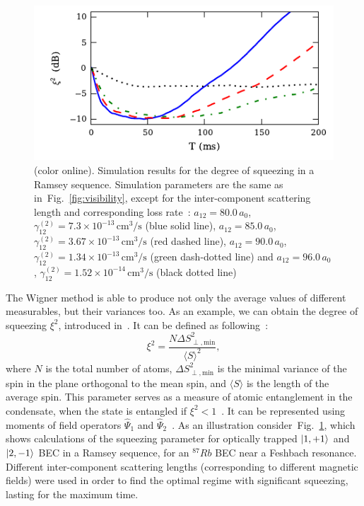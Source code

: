 \documentclass[aps,prl,twocolumn,showpacs,amsmath,amssymb,superscriptaddress]{revtex4-1}
\newcommand{\figref}[1]{Fig.~\ref{#1}}
\newcommand{\ket}[1]{\mbox{\ensuremath{| #1 \rangle}}}
\begin{document}
\begin{figure}
	\includegraphics{figures_generated/ramsey_squeezing.pdf}

	\caption{(color online).
	Simulation results for the degree of squeezing in a Ramsey sequence.
	Simulation parameters are the same as in~\figref{fig:visibility},
	except for the inter-component scattering length and corresponding loss rate~\cite{Kaufman2009}:
	$a_{12} = 80.0\,a_0$, $\gamma^{(2)}_{12} = 7.3 \times 10^{-13}\,\mathrm{cm^3/s}$ (blue solid line),
	$a_{12} = 85.0\,a_0$, $\gamma^{(2)}_{12} = 3.67 \times 10^{-13}\,\mathrm{cm^3/s}$ (red dashed line),
	$a_{12} = 90.0\,a_0$, $\gamma^{(2)}_{12} = 1.34 \times 10^{-13}\,\mathrm{cm^3/s}$ (green dash-dotted line) and
	$a_{12} = 96.0\,a_0$, $\gamma^{(2)}_{12} = 1.52 \times 10^{-14}\,\mathrm{cm^3/s}$ (black dotted line)}

	\label{fig:squeezing}
\end{figure}

The Wigner method is able to produce not only the average values of different measurables,
but their variances too.
As an example, we can obtain the degree of squeezing $\xi^2$, introduced in~\cite{Wineland1994,Sorensen2001}.
It can be defined as following~\cite{Li2009}:
\begin{equation}
\label{eqn:squeezing}
	\xi^2 = \frac{N \Delta S^2_{\perp, \mathrm{min}}}{\langle S \rangle^2},
\end{equation}
where $N$ is the total number of atoms,
$\Delta S^2_{\perp, \mathrm{min}}$ is the minimal variance of the spin in the plane orthogonal to the mean spin,
and $\langle S \rangle$ is the length of the average spin.
This parameter serves as a measure of atomic entanglement in the condensate,
when the state is entangled if $\xi^2 < 1$~\cite{Sorensen2001}.
It can be represented using moments of field operators $\widehat{\Psi}_1$
and $\widehat{\Psi}_2$~\cite{Li2009}.
As an illustration consider~\figref{fig:squeezing}, which shows calculations of the squeezing parameter
for optically trapped $\ket{1,+1}$ and $\ket{2,-1}$ BEC in a Ramsey sequence, for an $^{87}Rb$ BEC near a Feshbach resonance.
Different inter-component scattering lengths (corresponding to different magnetic fields) were used in order to find the optimal regime
with significant squeezing, lasting for the maximum time.
\end{document}
